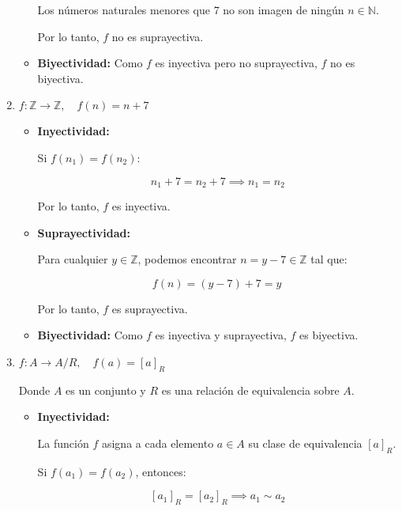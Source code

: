 \begin{solution}
\begin{enumerate}
\begin{itemize}
			            Los números naturales menores que 7 no son imagen de ningún \( n \in \mathbb{N} \).

			            Por lo tanto, \( f \) no es suprayectiva.

			      \item \textbf{Biyectividad:} Como \( f \) es inyectiva pero no suprayectiva, \( f \) no es biyectiva.
		      \end{itemize}

		\item  \( f : \mathbb{Z} \rightarrow \mathbb{Z}, \quad f(n) = n + 7 \)
		      \begin{itemize}
			      \item \textbf{Inyectividad:}

			            Si \( f(n_1) = f(n_2) \):

			            \[
				            n_1 + 7 = n_2 + 7 \implies n_1 = n_2
			            \]

			            Por lo tanto, \( f \) es inyectiva.

			      \item \textbf{Suprayectividad:}

			            Para cualquier \( y \in \mathbb{Z} \), podemos encontrar \( n = y - 7 \in \mathbb{Z} \) tal que:

			            \[
				            f(n) = (y - 7) + 7 = y
				            \,           \]

			            Por lo tanto, \( f \) es suprayectiva.

			      \item \textbf{Biyectividad:} Como \( f \) es inyectiva y suprayectiva, \( f \) es biyectiva.
		      \end{itemize}

		\item  \( f : A \rightarrow A/R, \quad f(a) = [a]_R \)

		      Donde \( A \) es un conjunto y \( R \) es una relación de equivalencia sobre \( A \).

		      \begin{itemize}
			      \item \textbf{Inyectividad:}

			            La función \( f \) asigna a cada elemento \( a \in A \) su clase de equivalencia \( [a]_R \).

			            Si \( f(a_1) = f(a_2) \), entonces:

			            \[
				            [a_1]_R = [a_2]_R \implies a_1 \sim a_2
			            \]


\end{itemize}
\end{enumerate}
\end{solution}
